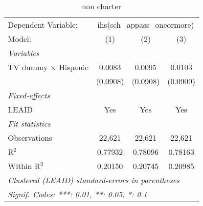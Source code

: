 \begin{table}[htbp]
\centering
\caption{non charter}
\begin{tabular}{lccc}
\tabularnewline\midrule\midrule
Dependent Variable:&\multicolumn{3}{c}{ihs(sch\_appass\_oneormore)}\\
Model:&(1) & (2) & (3)\\
\midrule \emph{Variables}&   &   &  \\
TV dummy $\times$ Hispanic & 0.0083 & 0.0095 & 0.0103\\
  &(0.0908) & (0.0908) & (0.0909)\\
\midrule \emph{Fixed-effects}&   &   &  \\
LEAID & Yes & Yes & Yes\\
\midrule \emph{Fit statistics}&  & & \\
Observations & 22,621&22,621&22,621\\
R$^2$ & 0.77932&0.78096&0.78163\\
Within R$^2$ & 0.20150&0.20745&0.20985\\
\midrule\midrule\multicolumn{4}{l}{\emph{Clustered (LEAID) standard-errors in parentheses}}\\
\multicolumn{4}{l}{\emph{Signif. Codes: ***: 0.01, **: 0.05, *: 0.1}}\\
\end{tabular}
\end{table}

